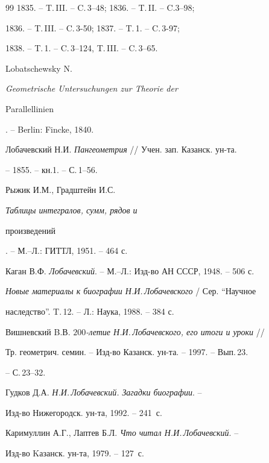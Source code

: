 \begin{thebibliography}{99}
1835. -- T.\,III. -- C.\,3--48; 1836. -- T.\,II. -- C.3--98;


1836. -- T.\,III. -- C.\,3-50; 1837. -- T.\,1. -- C.\,3-97;


1838. -- T.\,1. -- C.\,3--124, T.\,III. -- C.\,3--65.




Lobatschewsky N. {\em Geometrische Untersuchungen zur Theorie der 


Parallellinien}. -- Berlin: Fincke, 1840.




Лобачевский Н.И. {\em Пангеометрия} // Учен. зап. Казанск. ун-та.


-- 1855. -- кн.1. -- С.\,1--56. 




Рыжик И.М., Градштейн И.С. {\em Таблицы интегралов, сумм, рядов и


произведений}. -- М.--Л.: ГИТТЛ, 1951. -- 464 с.


\bibitem{}


Каган В.Ф. {\em Лобачевский}. -- М.--Л.: Изд-во АН СССР, 1948. -- 506 с.




{\em Новые материалы к биографии Н.И.\,Лобачевского} / Сер. ``Научное


наследство''. T.\,12. -- Л.: Наука, 1988. -- 384 с.




Вишневский B.В. {\em $200$-летие Н.И.\,Лобачевского, его итоги и уроки} //


Тр. геометрич. семин. -- Изд-во Казанск. ун-та. -- 1997. -- Вып.\,23.


-- С.\,23--32.




Гудков Д.А. {\em Н.И.\,Лобачевский. Загадки биографии}. -- 


Изд-во Нижегородск. ун-та, 1992. -- 241~с.




Каримуллин А.Г., Лаптев Б.Л. {\em Что читал Н.И.\,Лобачевский}. --


Изд-во Kазанск. ун-та, 1979. -- 127~с.





\end{thebibliography}





\vskip 2cm












\label{end}





